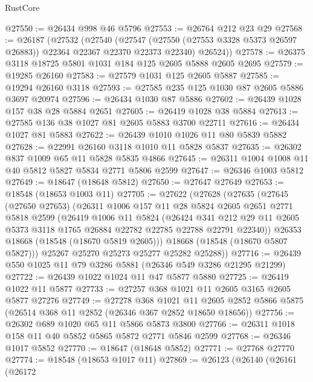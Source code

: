 \begin{lexlean}{RustCore}
\begin{coremodule}
@27550 := @26434 @998 @46 @5796
@27553 := @26764 @212 @23 @29
@27568 := @26187
    (@27532
      (@27540
        (@27547 (@27550 (@27553 @3328 @5373 @26597 @26883)) @22364 @22367 @22370 @22373 @22340)
        @26524))
@27578 := @26375 @3118 @18725 @5801 @1031 @184 @125 @2605 @5888 @2605 @2695
@27579 := @19285 @26160
@27583 := @27579 @1031 @125 @2605 @5887
@27585 := @19294 @26160 @3118
@27593 := @27585 @235 @125 @1030 @87 @2605 @5886 @3697 @20974
@27596 := @26434 @1030 @87 @5886
@27602 := @26439 @1028 @157 @38 @28 @5884 @2651
@27605 := @26419 @1028 @38 @5884
@27613 := @27585 @136 @38 @1027 @81 @2605 @5883 @3700 @22711
@27616 := @26434 @1027 @81 @5883
@27622 := @26439 @1010 @1026 @11 @80 @5839 @5882
@27628 := @22991 @26160 @3118 @1010 @11 @5828 @5837
@27635 := @26302 @837 @1009 @65 @11 @5828 @5835 @4866
@27645 := @26311 @1004 @1008 @11 @40 @5812 @5827 @5834 @2771 @5806 @2599
@27647 := @26346 @1003 @5812
@27649 := @18647 (@18648 @5812)
@27650 := @27647 @27649
@27653 := @18548 (@18653 @1003 @11)
@27705 := @27622
    (@27628
      (@27635
        (@27645
          (@27650 @27653)
          (@26311
            @1006
            @157
            @11
            @28
            @5824
            @2605
            @2651
            @2771
            @5818
            @2599
            (@26419
              @1006
              @11
              @5824
              (@26424
                @341
                @212
                @29
                @11
                @2605
                @5373
                @3118
                @1765
                @26884
                @22782
                @22785
                @22788
                @22791
                @22340))
            @26353
            @18668
            (@18548 (@18670 @5819 @2605)))
          @18668
          (@18548 (@18670 @5807 @5827)))
        @25267
        @25270
        @25273
        @25277
        @25282
        @25288))
@27716 := @26439 @550 @1025 @11 @79 @3286 @5881 (@26346 @549 @3286 @21295 @21299)
@27722 := @26439 @1022 @1024 @11 @47 @5877 @5880
@27725 := @26419 @1022 @11 @5877
@27733 := @27257 @368 @1021 @11 @2605 @3165 @2605 @5877 @27276
@27749 := @27278
    @368
    @1021
    @11
    @2605
    @2852
    @5866
    @5875
    (@26514 @368 @11 @2852 (@26346 @367 @2852 @18650 @18656))
@27756 := @26302 @689 @1020 @65 @11 @5866 @5873 @3800
@27766 := @26311 @1018 @158 @11 @40 @5852 @5865 @5872 @2771 @5846 @2599
@27768 := @26346 @1017 @5852
@27770 := @18647 (@18648 @5852)
@27771 := @27768 @27770
@27774 := @18548 (@18653 @1017 @11)
@27869 := @26123
    (@26140
      (@26161
        (@26172

\end{coremodule}
\end{lexlean}
